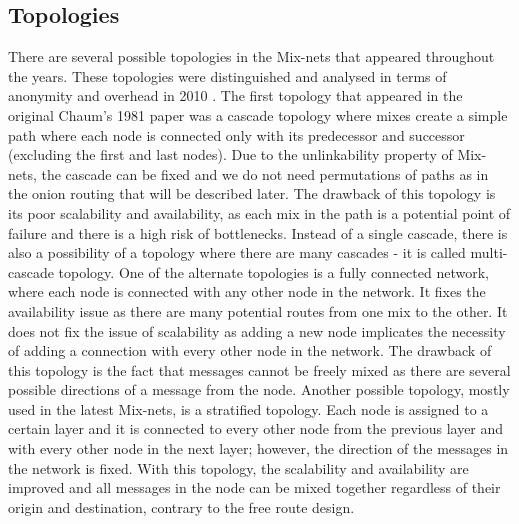 \subsection{Topologies}
There are several possible topologies in the Mix-nets that appeared throughout the years. These topologies were distinguished and analysed in terms of anonymity and overhead in 2010 \cite{topology}. The first topology that appeared in the original Chaum’s 1981 paper was a cascade topology where mixes create a simple path where each node is connected only with its predecessor and successor (excluding the first and last nodes). Due to the unlinkability property of Mix-nets, the cascade can be fixed and we do not need permutations of paths as in the onion routing that will be described later. The drawback of this topology is its poor scalability and availability, as each mix in the path is a potential point of failure and there is a high risk of bottlenecks.
Instead of a single cascade, there is also a possibility of a topology where there are many cascades - it is called multi-cascade topology.
One of the alternate topologies is a fully connected network, where each node is connected with any other node in the network. It fixes the availability issue as there are many potential routes from one mix to the other. It does not fix the issue of scalability as adding a new node implicates the necessity of adding a connection with every other node in the network. The drawback of this topology is the fact that messages cannot be freely mixed as there are several possible directions of a message from the node.
Another possible topology, mostly used in the latest Mix-nets, is a stratified topology. Each node is assigned to a certain layer and it is connected to every other node from the previous layer and with every other node in the next layer; however, the direction of the messages in the network is fixed. With this topology, the scalability and availability are improved and all messages in the node can be mixed together regardless of their origin and destination, contrary to the free route design.


